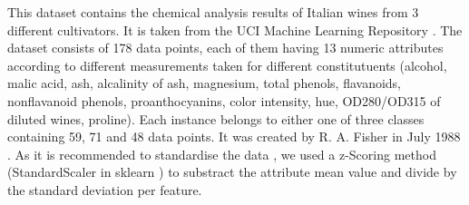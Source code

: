 \marginnote{\textcolor{blue}{Jonas Elpelt}}
This dataset contains the chemical analysis results of Italian wines from 3 different cultivators. It is taken from the UCI Machine Learning Repository \cite{Dua2019}. 
The dataset consists of 178 data points, each of them having 13 numeric attributes according to different measurements taken for different constitutuents (alcohol, malic acid, ash, alcalinity of ash, magnesium, total phenols, flavanoids, nonflavanoid phenols, proanthocyanins, color intensity, hue, OD280/OD315 of diluted wines, proline). Each instance belongs to either one of three classes containing 59, 71 and 48 data points. 
It was created by R. A. Fisher in July 1988 \cite{scikitlearn}. 
As it is recommended to standardise the data \cite{Dua2019}, we used a z-Scoring method (StandardScaler in sklearn \cite{scikitlearn}) to substract the attribute mean value and divide by the standard deviation per feature. 